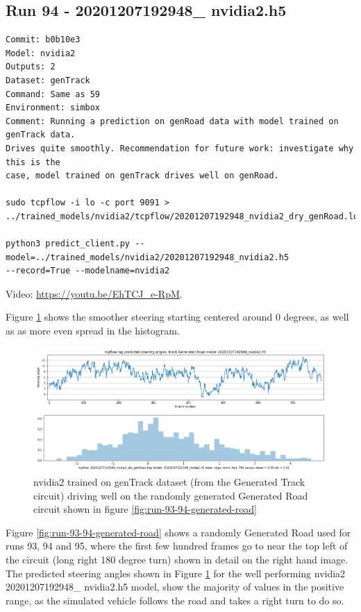 \subsection{Run 94 - 20201207192948\_ nvidia2.h5 }
\label{app_res:94}
\begin{verbatim}
Commit: b0b10e3
Model: nvidia2
Outputs: 2 
Dataset: genTrack
Command: Same as 59
Environment: simbox
Comment: Running a prediction on genRoad data with model trained on genTrack data.
Drives quite smoothly. Recommendation for future work: investigate why this is the
case, model trained on genTrack drives well on genRoad.

sudo tcpflow -i lo -c port 9091 >
../trained_models/nvidia2/tcpflow/20201207192948_nvidia2_dry_genRoad.log

python3 predict_client.py --model=../trained_models/nvidia2/20201207192948_nvidia2.h5
--record=True --modelname=nvidia2

\end{verbatim}
Video: \url{https://youtu.be/EhTCJ_e-RpM}. 

Figure \ref{fig:20201207192948_nvidia2_dry_genRoad} shows the smoother steering starting centered around 0 degrees, as well as as more even spread in the histogram.


\begin{figure}[ht]
 \centering 
 \includegraphics[width=\textwidth]{Figures/20201207192948_nvidia2_dry_genRoad.png}
 \caption{nvidia2 trained on genTrack dataset (from the Generated Track circuit) driving well on the randomly generated Generated Road circuit shown in figure \ref{fig:run-93-94-generated-road}}
 \label{fig:20201207192948_nvidia2_dry_genRoad} 
\end{figure}

Figure \ref{fig:run-93-94-generated-road} shows a randomly Generated Road used for runs 93, 94 and 95, where the first few hundred frames go to near the top left of the circuit (long right 180 degree turn) shown in detail on the right hand image. The predicted steering angles shown in Figure  \ref{fig:20201207192948_nvidia2_dry_genRoad} for the well performing nvidia2 20201207192948\_ nvidia2.h5 model, show the majority of values in the positive range, as the simulated vehicle follows the road and takes a right turn to do so.


